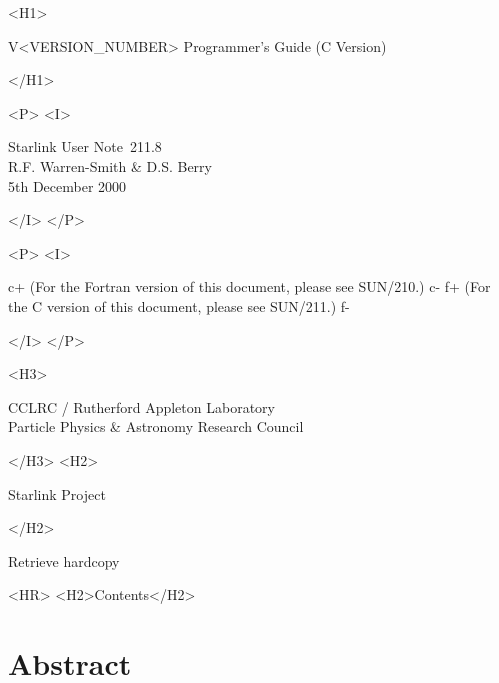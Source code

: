 \documentclass[twoside,11pt]{article}
\newcommand{\stardoccategory}  {Starlink User Note}
\newcommand{\stardocsource}    {sun\stardocnumber}
\newcommand{\stardocnumber}    {211.8}
\newcommand{\stardocnumber}    {210.8}
\newcommand{\stardocauthors}   {R.F. Warren-Smith \& D.S. Berry}
\newcommand{\stardocdate}      {5th December 2000}
\newcommand{\stardocversion}   {V<VERSION_NUMBER>}
\newcommand{\stardocmanualhtml}{Programmer's Guide (C Version)}
\newcommand{\stardocmanualhtml}{Programmer's Guide (Fortran Version)}
\newcommand{\htmladdnormallink}[2]{#1}
\newcommand{\htmladdimg}[1]{}
\newcommand{\htmlref}[2]{#1}
\newcommand{\htmladdtonavigation}[1]{}
\newcommand{\xref}[3]{#1}
\newcommand{\xlabel}[1]{}
\newcommand{\latexonlytoc}[0]{\tableofcontents}
\begin{document}
\begin{htmlonly}
   \begin{rawhtml} <H1> \end{rawhtml}
      \stardocversion
      \stardocmanualhtml
   \begin{rawhtml} </H1> \end{rawhtml}
   \begin{rawhtml} <P> <I> \end{rawhtml}
   \stardoccategory\ \stardocnumber \\
   \stardocauthors \\
   \stardocdate
   \begin{rawhtml} </I> </P> \end{rawhtml}
   \begin{rawhtml} <P> <I> \end{rawhtml}
c+
   (For the Fortran version of this document, please see
    \xref{SUN/210}{sun210}{}.)
c-
f+
   (For the C version of this document, please see \xref{SUN/211}{sun211}{}.)
f-
   \begin{rawhtml} </I> </P> \end{rawhtml}
   \begin{rawhtml} <H3> \end{rawhtml}
      \htmladdnormallink{CCLRC}{http://www.cclrc.ac.uk} /
      \htmladdnormallink{Rutherford Appleton Laboratory}
                        {http://www.cclrc.ac.uk/ral} \\
      \htmladdnormallink{Particle Physics \& Astronomy Research Council}
                        {http://www.pparc.ac.uk} \\
   \begin{rawhtml} </H3> <H2> \end{rawhtml}
      \htmladdnormallink{Starlink Project}{http://www.starlink.rl.ac.uk/}
   \begin{rawhtml} </H2> \end{rawhtml}
   \htmladdnormallink{\htmladdimg{source.gif} Retrieve hardcopy}
      {http://www.starlink.rl.ac.uk/cgi-bin/hcserver?\stardocsource}\\

  \label{stardoccontents}
  \begin{rawhtml} 
    <HR>
    <H2>Contents</H2>
  \end{rawhtml}
  \renewcommand{\latexonlytoc}[0]{}
  \htmladdtonavigation{\htmlref{\htmladdimg{contents_motif.gif}}
        {stardoccontents}}

  \section{\xlabel{abstract}Abstract}
\end{htmlonly}
\end{document}
